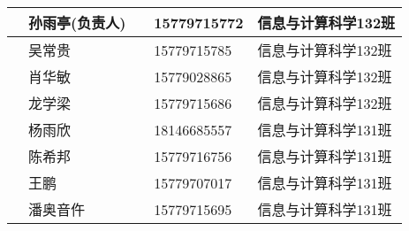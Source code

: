 \documentclass[12pt,a4paper]{article}
\begin{document}
\begin{CJK}{UTF8}{gbsn}
\begin{flushleft}
\begin{longtable}{|l|l|l|l|l|}
           & 孙雨亭(负责人) &            & 15779715772 & 信息与计算科学132班 \\ \hline 
           & 吴常贵         &            & 15779715785 & 信息与计算科学132班 \\ \hline 
           & 肖华敏         &            & 15779028865 & 信息与计算科学132班 \\ \hline 
           & 龙学梁         &            & 15779715686 & 信息与计算科学132班 \\ \hline 
           & 杨雨欣         &            & 18146685557 & 信息与计算科学131班 \\ \hline 
           & 陈希邦         &            & 15779716756 & 信息与计算科学131班 \\ \hline
           & 王鹏           &            & 15779707017 & 信息与计算科学131班 \\ \hline 
           & 潘奥音仵       &            & 15779715695 & 信息与计算科学131班 \\ \hline 


\end{longtable}
\end{flushleft}
\end{CJK}
\end{document}
